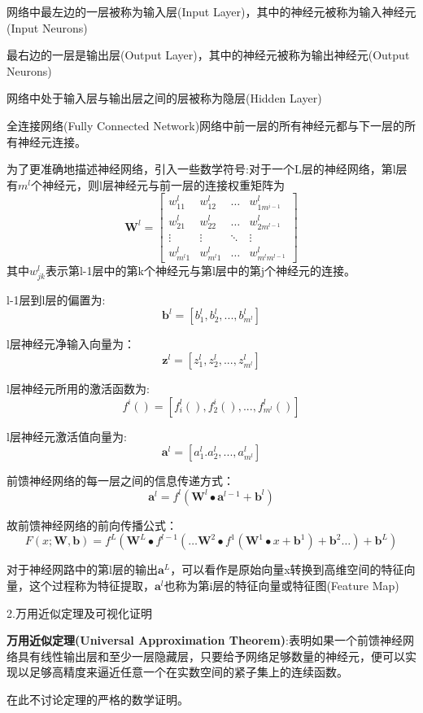 \documentclass[openbib]{article}
\begin{document}
网络中最左边的一层被称为输入层(Input Layer)，其中的神经元被称为输入神经元(Input Neurons)

最右边的一层是输出层(Output Layer)，其中的神经元被称为输出神经元(Output Neurons)

网络中处于输入层与输出层之间的层被称为隐层(Hidden Layer)

全连接网络(Fully Connected Network)网络中前一层的所有神经元都与下一层的所有神经元连接。

为了更准确地描述神经网络，引入一些数学符号:对于一个L层的神经网络，第l层有$m^l$个神经元，则l层神经元与前一层的连接权重矩阵为
$$\textbf{W}^l=\begin{bmatrix}
	w_{11}^l & w_{12}^l & \dots & w_{1m^{i-1}}^l \\
	w_{21}^l & w_{22}^l & \dots &  w_{2m^{l-1}}^l\\
	\vdots & \vdots & \ddots & \vdots \\
	w_{m^l1}^l & w_{m^l1}^l & \dots & w_{m^lm^{l-1}}^l
\end{bmatrix}$$
其中$w_{jk}^l$表示第l-1层中的第k个神经元与第l层中的第j个神经元的连接。

l-1层到l层的偏置为:$$\textbf{b}^l = [b_1^l,b_2^l,...,b_{m^l}^l]$$

l层神经元净输入向量为：$$\textbf{z}^l=[z_1^l,z_2^l,...,z_{m^l}^l]$$

l层神经元所用的激活函数为:$$f^i()=[f_i^l(),f_2^i(),...,f_{m^l}^l()]$$

l层神经元激活值向量为:$$\textbf{a}^l=[a_1^l.a_2^l,...,a_{m^l}^l]$$

前馈神经网络的每一层之间的信息传递方式：$$\textbf{a}^l=f^l(\textbf{W}^l\bullet \textbf{a}^{l-1}+\textbf{b}^l)$$

故前馈神经网络的前向传播公式：$$F(x;\textbf{W},\textbf{b})=f^L(\textbf{W}^L\bullet f^{l-1}(\dots\textbf{W}^2\bullet f^1(\textbf{W}^1\bullet x+\textbf{b}^1)+\textbf{b}^2\dots)+\textbf{b}^L)$$

对于神经网路中的第l层的输出$\textbf{a}^L$，可以看作是原始向量x转换到高维空间的特征向量，这个过程称为特征提取，$\textbf{a}^l$也称为第i层的特征向量或特征图(Feature Map)
\begin{center}
	2.万用近似定理及可视化证明
\end{center}
\textbf{万用近似定理(Universal Approximation Theorem)}:表明如果一个前馈神经网络具有线性输出层和至少一层隐藏层，只要给予网络足够数量的神经元，便可以实现以足够高精度来逼近任意一个在实数空间的紧子集上的连续函数。

在此不讨论定理的严格的数学证明。
\end{document}
